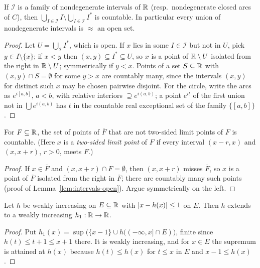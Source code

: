 \begin{lemma}\label{lem:intervals-open}
If $\mathcal I$ is a family of nondegenerate intervals of $\mathbb{R}$ (resp.\ nondegenerate closed arcs of $C$),
then $\bigcup_{I\in\mathcal I}I\setminus\bigcup_{I\in\mathcal I}I^*$ is countable. In particular every
union of nondegenerate intervals is $\approx$ an open set.
\end{lemma}
\begin{proof}
Let $U=\bigcup_{\mathcal I}I^*$, which is open. If $x$ lies in some $I\in\mathcal I$ but not in $U$,
pick $y\in I\setminus\{x\}$; if $x<y$ then $(x,y)\subseteq I^*\subseteq U$, so $x$ is a point of
$\mathbb{R}\setminus U$ isolated from the right in $\mathbb{R}\setminus U$; symmetrically if $y<x$. Points of a set
$S\subseteq\mathbb{R}$ with $(x,y)\cap S=\emptyset$ for some $y>x$ are countably many, since the intervals
$(x,y)$ for distinct such $x$ may be chosen pairwise disjoint. For the circle, write the arcs as
$e^{i[a,b]}$, $a<b$, with relative interiors $\supseteq e^{i(a,b)}$; a point $e^{it}$ of the first union
not in $\bigcup e^{i(a,b)}$ has $t$ in the countable real exceptional set of the family $\{[a,b]\}$.
\end{proof}

\begin{lemma}\label{lem:two-sided}
For $F\subseteq\mathbb{R}$, the set of points of $\overline F$ that are not two-sided limit points of $F$ is
countable. (Here $x$ is a \emph{two-sided limit point} of $F$ if every interval $(x-r,x)$ and $(x,x+r)$, $r>0$,
meets $F$.)
\end{lemma}
\begin{proof}
If $x\in\overline F$ and $(x,x+r)\cap F=\emptyset$, then $(x,x+r)$ misses $\overline F$, so $x$ is a point
of $\overline F$ isolated from the right in $\overline F$; there are countably many such points (proof
of Lemma~\ref{lem:intervals-open}). Argue symmetrically on the left.
\end{proof}

\begin{lemma}\label{lem:monotone-extend}
Let $h$ be weakly increasing on $E\subseteq\mathbb{R}$ with $\lvert x-h(x)\rvert\le1$ on $E$. Then $h$
extends to a weakly increasing $h_1:\mathbb{R}\to\mathbb{R}$.
\end{lemma}
\begin{proof}
Put $h_1(x)=\sup\bigl(\{x-1\}\cup h((-\infty,x]\cap E)\bigr)$, finite since $h(t)\le t+1\le x+1$ there.
It is weakly increasing, and for $x\in E$ the supremum is attained at $h(x)$ because $h(t)\le h(x)$ for
$t\le x$ in $E$ and $x-1\le h(x)$.
\end{proof}

